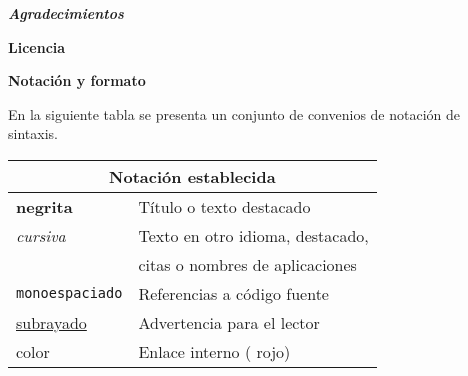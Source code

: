 


{\large \textbf{\textit{Agradecimientos}}\\} 
\lorem{}
\blankpage{}

{\large \textbf{Licencia}} \bigskip

%
%
%
%

\blankpage{}

{\large \textbf{Notación y formato}} \smallskip 

En la siguiente tabla se presenta un conjunto de convenios de notación de sintaxis.\smallskip 

\begin{tabular}{ll} \toprule
    \multicolumn{2}{c}{Notación establecida} \\ \midrule
    \textbf{negrita} & Título o texto destacado \\ \midrule
    \textit{cursiva} & Texto en otro idioma, destacado, \\ & citas o nombres de aplicaciones \\ \midrule
    \texttt{monoespaciado} & Referencias a código fuente \\ \midrule
    \underline{subrayado} & Advertencia para el lector \\ \midrule
    color &  Enlace interno ({\color{Red} rojo}) \\ \midrule
\end{tabular}

